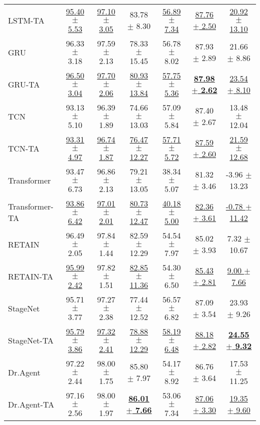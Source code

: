 \begin{table}[h!]
{\begin{tabular}{l|ccc|ccc}
LSTM-TA & \underline{95.40 $\pm$ 5.53} & \underline{97.10 $\pm$ 3.05} & 83.78 $\pm$ 8.30 & \underline{56.89 $\pm$ 7.34} & \underline{87.76 $\pm$ 2.50} & \underline{20.92 $\pm$ 13.10} \\ 
GRU & 96.33 $\pm$ 3.18 & 97.59 $\pm$ 2.13 & 78.33 $\pm$ 15.45 & 56.78 $\pm$ 8.02 & 87.93 $\pm$ 2.89 & 21.66 $\pm$ 8.86 \\ 
GRU-TA & \underline{96.50 $\pm$ 3.04} & \underline{97.70 $\pm$ 2.06} & \underline{80.93 $\pm$ 13.84} & \underline{57.75 $\pm$ 5.36} & \textbf{\underline{87.98 $\pm$ 2.62}} & \underline{23.54 $\pm$ 8.10} \\ 
TCN & 93.13 $\pm$ 5.10 & 96.39 $\pm$ 1.89 & 74.66 $\pm$ 13.03 & 57.09 $\pm$ 5.84 & 87.40 $\pm$ 2.67 & 13.48 $\pm$ 12.04 \\ 
TCN-TA & \underline{93.31 $\pm$ 4.97} & \underline{96.74 $\pm$ 1.87} & \underline{76.47 $\pm$ 12.27} & \underline{57.71 $\pm$ 5.72} & \underline{87.59 $\pm$ 2.60} & \underline{21.59 $\pm$ 12.68} \\ 
Transformer & 93.47 $\pm$ 6.73 & 96.86 $\pm$ 2.13 & 79.21 $\pm$ 13.05 & 38.34 $\pm$ 5.07 & 81.32 $\pm$ 3.46 & -3.96 $\pm$ 13.23 \\ 
Transformer-TA & \underline{93.86 $\pm$ 6.42} & \underline{97.01 $\pm$ 2.01} & \underline{80.73 $\pm$ 12.47} & \underline{40.18 $\pm$ 5.00} & \underline{82.36 $\pm$ 3.61} & \underline{-0.78 $\pm$ 11.42} \\ 
\midrule
\midrule
RETAIN & 96.49 $\pm$ 2.05 & 97.84 $\pm$ 1.44 & 82.59 $\pm$ 12.29 & 54.54 $\pm$ 7.97 & 85.02 $\pm$ 3.93 & 7.32 $\pm$ 10.67 \\ 
RETAIN-TA & \underline{95.99 $\pm$ 2.42} & 97.82 $\pm$ 1.51 & \underline{82.85 $\pm$ 11.36} & 54.30 $\pm$ 6.50 & \underline{85.43 $\pm$ 2.81} & \underline{9.00 $\pm$ 7.66} \\ 
StageNet & 95.71 $\pm$ 3.77 & 97.27 $\pm$ 2.38 & 77.44 $\pm$ 12.52 & 56.57 $\pm$ 6.82 & 87.09 $\pm$ 3.54 & 23.93 $\pm$ 9.26 \\ 
StageNet-TA & \underline{95.79 $\pm$ 3.86} & \underline{97.32 $\pm$ 2.41} & \underline{78.88 $\pm$ 12.29} & \underline{58.19 $\pm$ 6.48} & \underline{88.18 $\pm$ 2.82} & \textbf{\underline{24.55 $\pm$ 9.32}} \\ 
Dr.Agent & 97.22 $\pm$ 2.44 & 98.00 $\pm$ 1.75 & 85.80 $\pm$ 7.97 & 54.17 $\pm$ 8.92 & 86.76 $\pm$ 3.64 & 17.53 $\pm$ 11.25 \\ 
Dr.Agent-TA & 97.16 $\pm$ 2.56 & 98.00 $\pm$ 1.97 & \textbf{\underline{86.01 $\pm$ 7.66}} & 53.06 $\pm$ 7.34 & \underline{87.06 $\pm$ 3.30} & \underline{19.35 $\pm$ 9.60} \\ 

\end{tabular}}
\end{table}
